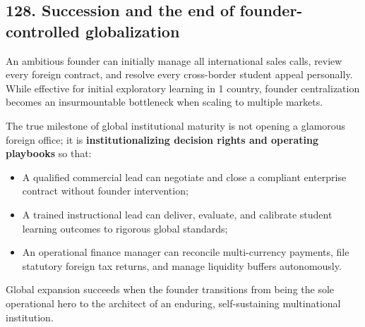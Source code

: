 \subsection{128. Succession and the end of founder-controlled globalization}

An ambitious founder can initially manage all international sales calls, review every foreign contract, and resolve every cross-border student appeal personally. While effective for initial exploratory learning in 1 country, founder centralization becomes an insurmountable bottleneck when scaling to multiple markets.

The true milestone of global institutional maturity is not opening a glamorous foreign office; it is \textbf{institutionalizing decision rights and operating playbooks} so that:
\begin{itemize}
    \item A qualified commercial lead can negotiate and close a compliant enterprise contract without founder intervention;
    \item A trained instructional lead can deliver, evaluate, and calibrate student learning outcomes to rigorous global standards;
    \item An operational finance manager can reconcile multi-currency payments, file statutory foreign tax returns, and manage liquidity buffers autonomously.
\end{itemize}
Global expansion succeeds when the founder transitions from being the sole operational hero to the architect of an enduring, self-sustaining multinational institution.

